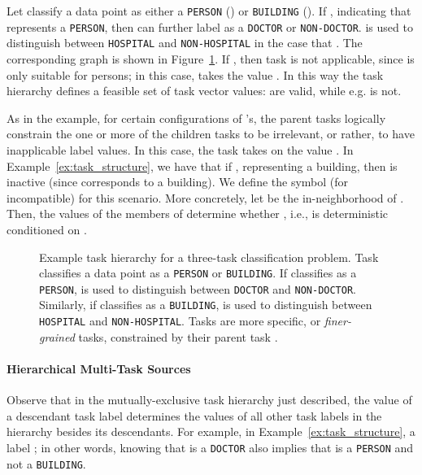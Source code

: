 \documentclass[letterpaper]{article}
\begin{document}
\begin{appendix}
\begin{example}
Let  classify a data point  as either a \texttt{PERSON} () or \texttt{BUILDING} ().
If , indicating that  represents a \texttt{PERSON}, then  can further label  as a \texttt{DOCTOR} or \texttt{NON-DOCTOR}.
 is used to distinguish between \texttt{HOSPITAL} and \texttt{NON-HOSPITAL} in the case that .
The corresponding graph  is shown in Figure~\ref{fig:tree_task}.
If , then task  is not applicable, since  is only suitable for persons; in this case,  takes the value .
In this way the task hierarchy defines a feasible set of task vector values:  are valid, while e.g.  is not.
\label{ex:task_structure}
\end{example}

As in the example, for certain configurations of 's, the parent tasks logically constrain the one or more of the children tasks to be irrelevant, or rather, to have inapplicable label values.
In this case, the task takes on the value .
In Example~\ref{ex:task_structure}, we have that if , representing a building, then  is inactive (since  corresponds to a building).
We define the symbol  (for incompatible) for this scenario.
More concretely, let  be the in-neighborhood of .
Then, the values of the members of  determine whether , i.e.,  is deterministic conditioned on . 
\begin{figure}
\centering
{}
\caption{
	Example task hierarchy  for a three-task classification problem.
	Task  classifies a data point  as a \texttt{PERSON} or \texttt{BUILDING}.
	If  classifies  as a \texttt{PERSON},  is used to distinguish between \texttt{DOCTOR} and \texttt{NON-DOCTOR}.
	Similarly, if  classifies  as a \texttt{BUILDING},  is used to distinguish between \texttt{HOSPITAL} and \texttt{NON-HOSPITAL}.
	Tasks  are more specific, or \textit{finer-grained} tasks, constrained by their parent task .
}
\label{fig:tree_task}
\end{figure}
\paragraph*{Hierarchical Multi-Task Sources}
Observe that in the mutually-exclusive task hierarchy just described, the value of a descendant task label  determines the values of all other task labels in the hierarchy besides its descendants.
For example, in Example~\ref{ex:task_structure}, a label ; in other words, knowing that  is a \texttt{DOCTOR} also implies that  is a \texttt{PERSON} and not a \texttt{BUILDING}.


\end{appendix}
\end{document}
